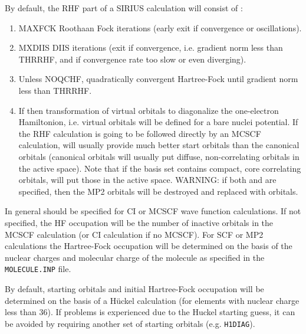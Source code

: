 By default, the RHF part of a SIRIUS calculation will consist of :
\begin{enumerate}
\item {MAXFCK Roothaan Fock iterations (early exit if convergence
    or oscillations).
}
\item {MXDIIS DIIS iterations (exit if convergence, i.e. gradient norm
    less than THRRHF, and if convergence rate too slow or even diverging).
}
\item {Unless NOQCHF, quadratically convergent Hartree-Fock until
    gradient norm less than THRRHF.
}
\item{If  then transformation of
    virtual orbitals to diagonalize
    the one-electron Hamiltonion, i.e. virtual orbitals will be defined
    for a bare nuclei potential.
    If the RHF calculation is going to be followed
    directly by an MCSCF calculation,
     will usually provide much
    better start orbitals than the canonical orbitals (canonical
    orbitals will usually put diffuse, non-correlating orbitals in the
    active space).  Note that if the basis set contains compact, core
    correlating orbitals,  will put those in the active space.
    WARNING: if both  and  are specified,
    then the MP2 orbitals will be destroyed and replaced with 
    orbitals.
}
\end{enumerate}
 
In general  should be specified for CI or
MCSCF wave function calculations.  If not specified, the HF
occupation 
will be the number of inactive orbitals in the MCSCF calculation (or
CI calculation if no MCSCF). For SCF or
MP2 calculations the 
Hartree-Fock occupation will be determined on the basis of the nuclear
charges and molecular charge of the molecule as specified in the
\verb|MOLECULE.INP| file.

By default, starting orbitals and initial Hartree-Fock occupation will
be determined on the basis of a H\"{u}ckel
calculation (for elements with 
nuclear charge less than 36). If problems is experienced due to the
Huckel starting guess, it can be avoided by requiring another set of
starting orbitals (e.g. \verb|H1DIAG|).


